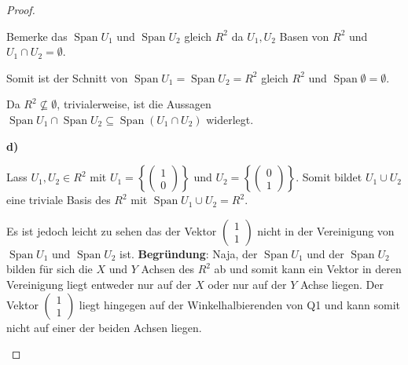 \documentclass{../problemset}
\begin{document}
\begin{problem}
\begin{proof}
\begin{enumerate}
		      Bemerke das \(\operatorname{Span} U_1\) und \(\operatorname{Span} U_2\) gleich \(R^2\) da \(U_1, U_2\) Basen von \(R^2\)
		      und \(U_1 \cap U_2 = \emptyset \).

		      Somit ist der Schnitt von \(\operatorname{Span} U_1 = \operatorname{Span} U_2 = R^2\) gleich \(R^2\) und \(\operatorname{Span} \emptyset = \emptyset\).

		      Da \(R^2 \not \subseteq \emptyset\), trivialerweise, ist die Aussagen \(\operatorname{Span} U_1 \cap \operatorname{Span} U_2 \subseteq \operatorname{Span}(U_1 \cap U_2)\) widerlegt. \checkmark

		      \textbf{d)}

		      Lass \(U_1, U_2 \in R^2\) mit \(U_1 = \left\{\begin{pmatrix}
			      1 \\0
		      \end{pmatrix}\right\}\) und \(U_2 = \left\{\begin{pmatrix}
			      0 \\1
		      \end{pmatrix}\right\}\).
		      Somit bildet \(U_1 \cup U_2\) eine triviale Basis des \(R^2\) mit \(\operatorname{Span} U_1 \cup U_2 = R^2\).

		      Es ist jedoch leicht zu sehen das der Vektor \(\begin{pmatrix}
			      1 \\ 1
		      \end{pmatrix}\) nicht in der Vereinigung von \(\operatorname{Span} U_1\) und \(\operatorname{Span} U_2\) ist.
		      \textbf{Begründung}: Naja, der \(\operatorname{Span} U_1\) und der \(\operatorname{Span} U_2\) bilden für sich die \(X\) und \(Y\)
		      Achsen des \(R^2\) ab und somit kann ein Vektor in deren Vereinigung liegt entweder nur auf der \(X\) oder nur auf der \(Y\) Achse liegen.
		      Der Vektor \(\begin{pmatrix}
			      1 \\ 1
		      \end{pmatrix}\) liegt hingegen auf der Winkelhalbierenden von Q1 und kann somit nicht auf einer der beiden Achsen liegen. \checkmark
	\end{enumerate}
\end{proof}
\end{problem}
\end{document}
